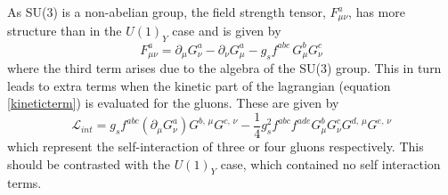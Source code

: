 As SU(3) is a non-abelian group, the field strength tensor, $F^a_{\mu \nu}$, has more structure than in the $U(1)_Y$ case and is  given by
\begin{equation}\label{su3fmunu}
F^a_{\mu \nu} = \partial_{\mu} G^a_{\nu} - \partial_{\nu} G^a_{\mu}
- g_s f^{abc} \, G^b_{\mu} G^c_{\nu}
\end{equation}
where the third term arises due to the algebra of the SU(3) group.
This in turn leads to extra terms when the kinetic part of the lagrangian (equation \ref{kineticterm}) is evaluated for the gluons. 
These are given by
 \begin{equation}
 \mathcal{L}_{int} = g_sf^{abc}(\partial_{\mu}G^a_{\nu})G^{b,\, \mu}G^{c, \, \nu} - \frac{1}{4}g_s^2f^{abc}f^{ade}G^b_{\mu}G^c_{\nu}G^{d, \, \mu}G^{e, \, \nu}
 \end{equation}
 which represent the self-interaction of three or four gluons respectively. This should be contrasted with the $U(1)_Y$ case, which contained no self interaction terms.

